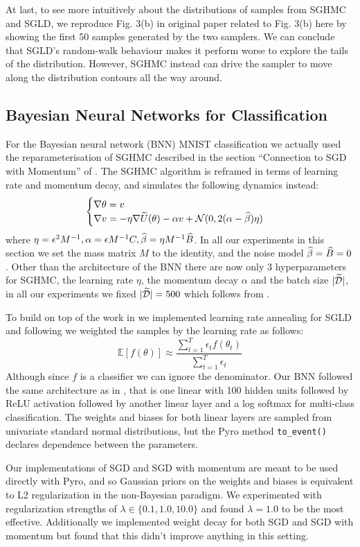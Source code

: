 At last, to see more intuitively about the distributions of samples from SGHMC and SGLD, we reproduce Fig. 3(b) in original paper related to Fig. 3(b) here by showing the first 50 samples generated by the two samplers. We can conclude that SGLD's random-walk behaviour makes it perform worse to explore the tails of the distribution. However, SGHMC instead can drive the sampler to move along the distribution contours all the way around.

\subsection{Bayesian Neural Networks for Classification}
For the Bayesian neural network (BNN) MNIST classification we actually used the reparameterisation of SGHMC described in the section ``Connection to SGD with Momentum'' of \cite{sghmc}. The SGHMC algorithm is reframed in terms of learning rate and momentum decay, and simulates the following dynamics instead:
$$\begin{cases}
\nabla \theta = v\\
\nabla v = - \eta \nabla \widetilde{U}(\theta) - \alpha v + \mathcal{N}(0, 2(\alpha - \widehat{\beta}) \eta)
\end{cases}
$$
where $\eta = \epsilon^2 M^{-1}, \alpha = \epsilon M^{-1}C, \widehat{\beta} = \eta M^{-1}\widehat{B}$. In all our experiments in this section we set the mass matrix $M $ to the identity, and the noise model $\widehat{\beta} = \widehat{B} = 0$. Other than the architecture of the BNN there are now only 3 hyperparameters for SGHMC, the learning rate $\eta$, the momentum decay $\alpha$ and the batch size $|\widetilde{\mathcal{D}}|$, in all our experiments we fixed $|\widetilde{\mathcal{D}}| = 500$ which follows from \cite{sghmc}.

To build on top of the work in \cite{sghmc} we implemented learning rate annealing for SGLD and following \cite{sgld} we weighted the samples by the learning rate as follows:
$$\mathbb{E}[f(\theta)] \approx \frac{\sum^T_{t=1} \epsilon_t f(\theta_t)}{\sum^T_{t=1} \epsilon_t}$$
Although since $f$ is a classifier we can ignore the denominator. Our BNN followed the same architecture as in \cite{sghmc}, that is one linear with 100 hidden units followed by ReLU activation followed by another linear layer and a log softmax for multi-class classification. The weights and biases for both linear layers are sampled from univariate standard normal distributions, but the Pyro method \texttt{to\_event()} declares dependence between the parameters. 

Our implementations of SGD and SGD with momentum are meant to be used directly with Pyro, and so Gaussian priors on the weights and biases is equivalent to L2 regularization in the non-Bayesian paradigm. We experimented with regularization strengths of $\lambda \in \{0.1, 1.0, 10.0\}$ and found $\lambda = 1.0$ to be the most effective. Additionally we implemented weight decay for both SGD and SGD with momentum but found that this didn't improve anything in this setting.

